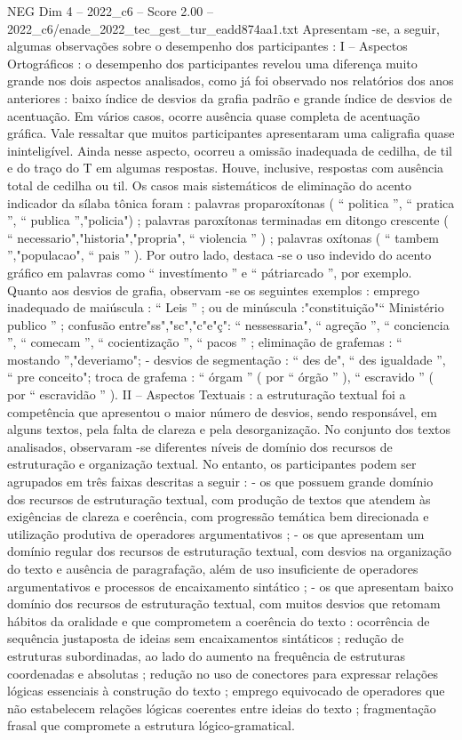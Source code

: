 \begin{textsample}{NEG Dim 4 – 2022\_c6 – Score 2.00 – 2022\_c6/enade\_2022\_tec\_gest\_tur\_eadd874aa1.txt}
Apresentam -se, a seguir, algumas observações sobre o desempenho dos participantes : I – Aspectos Ortográficos : o desempenho dos participantes revelou uma diferença muito grande nos dois aspectos analisados, como já foi observado nos relatórios dos anos anteriores : baixo índice de desvios da grafia padrão e grande índice de desvios de acentuação.
Em vários casos, ocorre ausência quase completa de acentuação gráfica.
Vale ressaltar que muitos participantes apresentaram uma caligrafia quase ininteligível.
Ainda nesse aspecto, ocorreu a omissão inadequada de cedilha, de til e do traço do T em algumas respostas.
Houve, inclusive, respostas com ausência total de cedilha ou til.
Os casos mais sistemáticos de eliminação do acento indicador da sílaba tônica foram : palavras proparoxítonas ( “ politica ”, “ pratica ”, “ publica ”,"policia") ; palavras paroxítonas terminadas em ditongo crescente ( “ necessario","historia","propria", “ violencia ” ) ; palavras oxítonas ( “ tambem ”,"populacao", “ pais ” ).
Por outro lado, destaca -se o uso indevido do acento gráfico em palavras como “ investímento ” e “ pátriarcado ”, por exemplo.
Quanto aos desvios de grafia, observam -se os seguintes exemplos : emprego inadequado de maiúscula : “ Leis ” ; ou de minúscula :"constituição"“ Ministério publico ” ; confusão entre"ss","sc","c"e"ç": “ nessessaria", “ agreção ”, “ conciencia ”, “ comecam ”, “ cocientização ”, “ pacos ” ; eliminação de grafemas : “ mostando ”,"deveriamo"; - desvios de segmentação : “ des de", “ des igualdade ”, “ pre conceito"; troca de grafema : “ órgam ” ( por “ órgão ” ), “ escravido ” ( por “ escravidão ” ).
II – Aspectos Textuais : a estruturação textual foi a competência que apresentou o maior número de desvios, sendo responsável, em alguns textos, pela falta de clareza e pela desorganização.
No conjunto dos textos analisados, observaram -se diferentes níveis de domínio dos recursos de estruturação e organização textual.
No entanto, os participantes podem ser agrupados em três faixas descritas a seguir : - os que possuem grande domínio dos recursos de estruturação textual, com produção de textos que atendem às exigências de clareza e coerência, com progressão temática bem direcionada e utilização produtiva de operadores argumentativos ; - os que apresentam um domínio regular dos recursos de estruturação textual, com desvios na organização do texto e ausência de paragrafação, além de uso insuficiente de operadores argumentativos e processos de encaixamento sintático ; - os que apresentam baixo domínio dos recursos de estruturação textual, com muitos desvios que retomam hábitos da oralidade e que comprometem a coerência do texto : ocorrência de sequência justaposta de ideias sem encaixamentos sintáticos ; redução de estruturas subordinadas, ao lado do aumento na frequência de estruturas coordenadas e absolutas ; redução no uso de conectores para expressar relações lógicas essenciais à construção do texto ; emprego equivocado de operadores que não estabelecem relações lógicas coerentes entre ideias do texto ; fragmentação frasal que compromete a estrutura lógico-gramatical.

\end{textsample}
